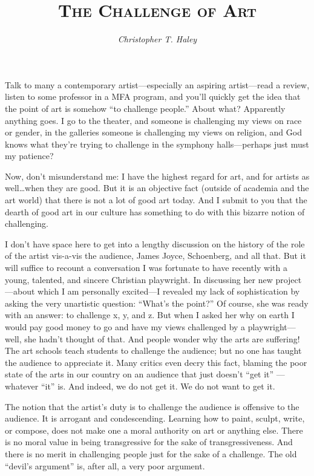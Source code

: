 \documentclass[letterpaper]{article}
\title{\textsc{The Challenge of Art}}
\author{\emph{Christopher T. Haley}}
\date{}
\begin{document}
\maketitle

Talk to many a contemporary artist---especially an aspiring
artist---read a review, listen to some professor in a MFA program,
and you'll quickly get the idea that the point of art is somehow ``to
challenge people.'' About what? Apparently anything goes. I go to the
theater, and someone is challenging my views on race or gender, in the
galleries someone is challenging my views on religion, and God knows
what they're trying to challenge in the symphony halls---perhaps just
must my patience?

Now, don't misunderstand me: I have the highest regard for art, and
for artists as well{\ldots}when they are good. But it is an objective
fact (outside of academia and the art world) that there is not a lot
of good art today. And I submit to you that the dearth of good art in
our culture has something to do with this bizarre notion of
challenging.

I don't have space here to get into a lengthy discussion on the
history of the role of the artist vis-a-vis the audience, James Joyce,
Schoenberg, and all that. But it will suffice to recount a
conversation I was fortunate to have recently with a young, talented,
and sincere Christian playwright. In discussing her new
project---about which I am personally excited---I revealed my lack of
sophistication by asking the very unartistic question: ``What's the
point?'' Of course, she was ready with an answer: to challenge x, y,
and z. But when I asked her why on earth I would pay good money to go
and have my views challenged by a playwright---well, she hadn't
thought of that. And people wonder why the arts are suffering! The art
schools teach students to challenge the audience; but no one has
taught the audience to appreciate it. Many critics even decry this
fact, blaming the poor state of the arts in our country on an audience
that just doesn't ``get it'' ---whatever ``it'' is. And indeed, we do
not get it. We do not want to get it.

The notion that the artist's duty is to challenge the audience is
offensive to the audience. It is arrogant and condescending. Learning
how to paint, sculpt, write, or compose, does not make one a moral
authority on art or anything else. There is no moral value in being
transgressive for the sake of transgressiveness. And there is no merit
in challenging people just for the sake of a challenge. The old
``devil's argument'' is, after all, a very poor argument.
\end{document}
